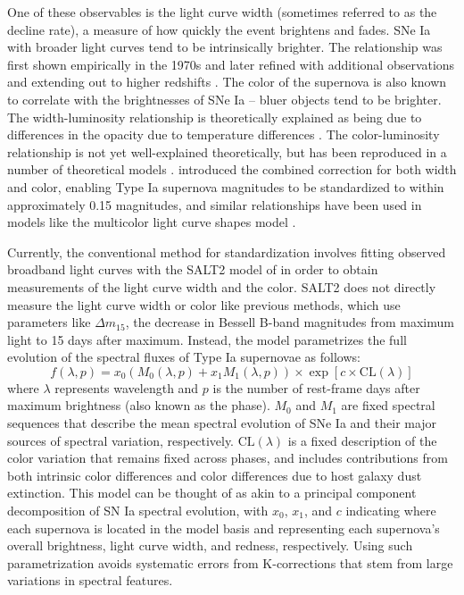 One of these observables is the light curve width (sometimes referred to as the decline rate), a measure of how quickly the event brightens and fades. SNe Ia with broader light curves tend to be intrinsically brighter. The relationship was first shown empirically in the 1970s \citep{rust_use_1974, pskovskii_light_1977} and later refined with additional observations and extending out to higher redshifts \citep{phillips_absolute_1993, hamuy_morphology_1996, perlmutter_measurements_1997}. The color of the supernova is also known to correlate with the brightnesses of SNe Ia -- bluer objects tend to be brighter. The width-luminosity relationship is theoretically explained as being due to differences in the opacity due to temperature differences \citep{kasen_origin_2007}. The color-luminosity relationship is not yet well-explained theoretically, but has been reproduced in a number of theoretical models \citep[e.g.][]{kasen_diversity_2009}. \citet{tripp_two-parameter_1998} introduced the combined correction for both width and color, enabling Type Ia supernova magnitudes to be standardized to within approximately 0.15 magnitudes, and similar relationships have been used in models like the multicolor light curve shapes model \citep[MLCS,][]{riess_precise_1996}.

Currently, the conventional method for standardization involves fitting observed broadband light curves with the SALT2 model of \citet{guy_salt2_2007} in order to obtain measurements of the light curve width and the color. SALT2 does not directly measure the light curve width or color like previous methods, which use parameters like $\Delta m_{15}$, the decrease in Bessell B-band magnitudes from maximum light to 15 days after maximum. Instead, the model parametrizes the full evolution of the spectral fluxes of Type Ia supernovae as follows:
\begin{equation}
    f(\lambda, p) = x_0\left(M_0(\lambda, p) + x_1 M_1(\lambda, p)\right) \times \exp [c\times\textrm{CL}(\lambda)]
    \label{eqn:salt_flux}
\end{equation}
where $\lambda$ represents wavelength and $p$ is the number of rest-frame days after maximum brightness (also known as the phase). $M_0$ and $M_1$ are fixed spectral sequences that describe the mean spectral evolution of SNe Ia and their major sources of spectral variation, respectively. $\textrm{CL}(\lambda)$ is a fixed description of the color variation that remains fixed across phases, and includes contributions from both intrinsic color differences and color differences due to host galaxy dust extinction. This model can be thought of as akin to a principal component decomposition of SN Ia spectral evolution, with $x_0$, $x_1$, and $c$ indicating where each supernova is located in the model basis and representing each supernova's overall brightness, light curve width, and redness, respectively. Using such parametrization avoids systematic errors from K-corrections that stem from large variations in spectral features.

